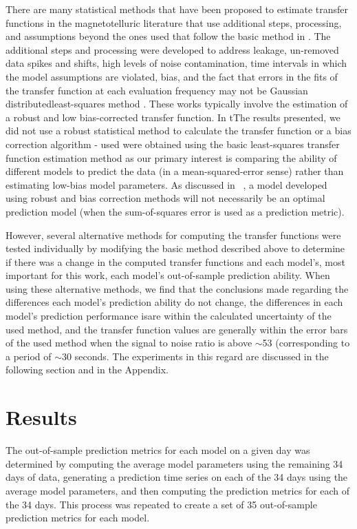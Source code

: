 \documentclass[draft,linenumbers]{agujournal2018}
\begin{document}
There are many statistical methods that have been proposed to estimate transfer functions in the magnetotelluric literature that use additional steps, processing, and assumptions \citep{Egbert1986,Chave1987,Chave1989,Jones1989,Larsen1996,Egbert1997,Eisel2001,Chave2004,Chave2012,Chave2017} beyond the ones used that follow the basic method in \cite{Simpson2005}. The additional steps and processing were developed to address leakage, un-removed data spikes and shifts, high levels of noise contamination, time intervals in which the model assumptions are violated, bias, and the fact that errors in the fits of the transfer function at each evaluation frequency may not be Gaussian distributedleast-squares method \citep{Simpson2005}. These works typically involve the estimation of a robust and low bias-corrected transfer function. In tThe results presented, we did not use a robust statistical method to calculate the transfer function or a bias correction algorithm - used were obtained using the basic least-squares transfer function estimation method as our primary interest is comparing the ability of different models to predict the data (in a mean-squared-error sense) rather than estimating low-bias model parameters. As discussed in ~\cite{Weigel2017}, a model developed using robust and bias correction methods will not necessarily be an optimal prediction model (when the sum-of-squares error is used as a prediction metric).

However, several alternative methods for computing the transfer functions were tested individually by modifying the basic method described above to determine if there was a change in the computed transfer functions and each model's, most important for this work, each model's out-of-sample prediction ability. When using these alternative methods, we find that the conclusions made regarding the differences each model's prediction ability do not change, the differences in each model's prediction performance isare within the calculated uncertainty of the used method, and the transfer function values are generally within the error bars of the used method when the signal to noise ratio is above $\sim$53 (corresponding to a period of $\sim 30$ seconds. The experiments in this regard are discussed in the following section and in the Appendix.

\section{Results}

The out-of-sample prediction metrics for each model on a given day was determined by computing the average model parameters using the remaining 34 days of data, generating a prediction time series on each of the 34 days using the average model parameters, and then computing the prediction metrics for each of the 34 days. This process was repeated to create a set of 35 out-of-sample prediction metrics for each model.
\end{document}
